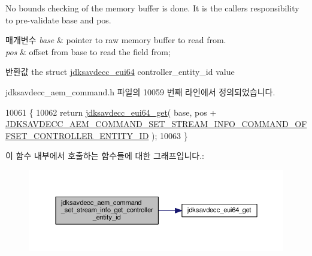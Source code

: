 No bounds checking of the memory buffer is done. It is the caller\textquotesingle{}s responsibility to pre-\/validate base and pos.


\begin{DoxyParams}{매개변수}
{\em base} & pointer to raw memory buffer to read from. \\
\hline
{\em pos} & offset from base to read the field from; \\
\hline
\end{DoxyParams}
\begin{DoxyReturn}{반환값}
the struct \hyperlink{structjdksavdecc__eui64}{jdksavdecc\+\_\+eui64} controller\+\_\+entity\+\_\+id value 
\end{DoxyReturn}


jdksavdecc\+\_\+aem\+\_\+command.\+h 파일의 10059 번째 라인에서 정의되었습니다.


\begin{DoxyCode}
10061 \{
10062     \textcolor{keywordflow}{return} \hyperlink{group__eui64_ga2652311a25a6b91cddbed75c108c7031}{jdksavdecc\_eui64\_get}( base, pos + 
      \hyperlink{group__command__set__stream__info_gafc14cf65f1fb7f017df2e4c2e9e7c7fe}{JDKSAVDECC\_AEM\_COMMAND\_SET\_STREAM\_INFO\_COMMAND\_OFFSET\_CONTROLLER\_ENTITY\_ID}
       );
10063 \}
\end{DoxyCode}


이 함수 내부에서 호출하는 함수들에 대한 그래프입니다.\+:
\nopagebreak
\begin{figure}[H]
\begin{center}
\leavevmode
\includegraphics[width=350pt]{group__command__set__stream__info_gaeab845c58fecc10bf92582d05e595638_cgraph}
\end{center}
\end{figure}


